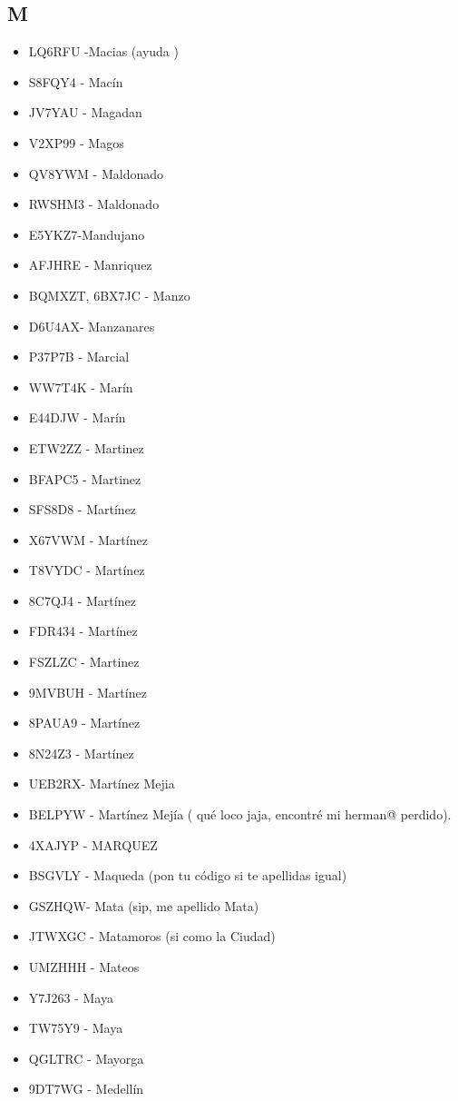 \subsection*{M}
\begin{itemize}[leftmargin=*,nosep]
\item LQ6RFU -Macias (ayuda )
\item S8FQY4 - Macín
\item JV7YAU - Magadan
\item V2XP99 - Magos
\item QV8YWM  -  Maldonado
\item RWSHM3 - Maldonado
\item E5YKZ7-Mandujano
\item AFJHRE  -  Manriquez
\item BQMXZT, 6BX7JC  -  Manzo
\item D6U4AX- Manzanares
\item P37P7B - Marcial
\item WW7T4K  -  Marín
\item E44DJW  -  Marín
\item ETW2ZZ  -  Martinez
\item BFAPC5  -  Martinez
\item SFS8D8  -  Martínez
\item X67VWM  -  Martínez
\item T8VYDC - Martínez
\item 8C7QJ4  -  Martínez
\item FDR434 -  Martínez
\item FSZLZC  -  Martinez
\item 9MVBUH  -  Martínez
\item 8PAUA9 - Martínez
\item 8N24Z3  - Martínez
\item UEB2RX- Martínez Mejia
\item BELPYW - Martínez Mejía ( qué loco jaja, encontré mi herman@ perdido).
\item 4XAJYP - MARQUEZ
\item BSGVLY - Maqueda (pon tu código si te apellidas igual)
\item GSZHQW- Mata (sip, me apellido Mata)
\item JTWXGC - Matamoros (si como la Ciudad)
\item UMZHHH - Mateos
\item Y7J263 - Maya
\item TW75Y9  -  Maya
\item QGLTRC - Mayorga
\item 9DT7WG  -  Medellín

\end{itemize}
